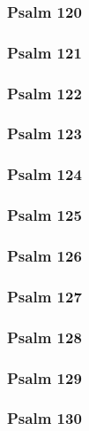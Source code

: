 \documentclass[10pt]{extarticle}
\begin{document}
\begin{multicols}{2}
\subsubsection{Psalm 120}

\newpage

\subsubsection{Psalm 121}

\newpage

\subsubsection{Psalm 122}

\newpage

\subsubsection{Psalm 123}

\newpage

\subsubsection{Psalm 124}

\newpage

\subsubsection{Psalm 125}

\newpage

\subsubsection{Psalm 126}

\newpage

\subsubsection{Psalm 127}

\newpage

\subsubsection{Psalm 128}

\newpage

\subsubsection{Psalm 129}

\newpage

\subsubsection{Psalm 130}

\newpage


\end{multicols}
\end{document}
